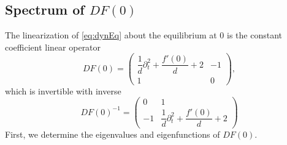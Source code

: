 \documentclass[12pt,reqno]{amsart}
\begin{document}
\subsection{Spectrum of \texorpdfstring{$DF(0)$}{DF(0)}}

The linearization of \cref{eq:dynEq} about the equilibrium at 0 is the constant coefficient linear operator 
\begin{equation}\label{eq:DF0}
DF(0) = \begin{pmatrix}
\dfrac{1}{d}\partial_t^2 + \dfrac{f'(0)}{d} + 2 & -1 \\ 1 & 0
\end{pmatrix},
\end{equation}
which is invertible with inverse
\begin{equation}\label{eq:DF0inv}
DF(0)^{-1} = \begin{pmatrix}
0 & 1 \\ -1 & \dfrac{1}{d}\partial_t^2 + \dfrac{f'(0)}{d} + 2
\end{pmatrix}
\end{equation}
First, we determine the eigenvalues and eigenfunctions of $DF(0)$.
\end{document}
